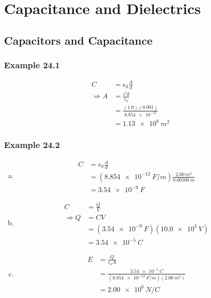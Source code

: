 \documentclass{article}
\begin{document}
\section{Capacitance and Dielectrics}

\subsection{Capacitors and Capacitance}

\subsubsection{Example 24.1}

\begin{align*}
  C             & = \epsilon_0 \frac{A}{d}                \\
  \Rightarrow A & = \frac{C d}{\epsilon_0}                \\
                & = \frac{(1.0) (0.001)}{\num{8.854e-12}} \\
                & = \qty{1.13e8}{m^2}
\end{align*}

\subsubsection{Example 24.2}

\begin{enumerate}[(a)]
  \item

        \begin{align*}
          C & = \epsilon_0 \frac{A}{d}                                          \\
            & = (\qty{8.854e-12}{F/m}) \frac{\qty{2.00}{m^2}}{\qty{0.00500}{m}} \\
            & = \qty{3.54e-9}{F}
        \end{align*}

  \item

        \begin{align*}
          C             & = \frac{Q}{V}                          \\
          \Rightarrow Q & = C V                                  \\
                        & = (\qty{3.54e-9}{F}) (\qty{10.0e3}{V}) \\
                        & = \qty{3.54e-5}{C}
        \end{align*}

  \item

        \begin{align*}
          E & = \frac{Q}{\epsilon_0 A}                                            \\
            & = \frac{\qty{3.54e-5}{C}}{(\qty{8.854e-12}{F/m}) (\qty{2.00}{m^2})} \\
            & = \qty{2.00e6}{N/C}
        \end{align*}
\end{enumerate}
\end{document}
